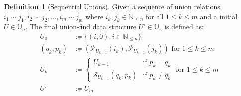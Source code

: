 \documentclass[a4paper,12pt]{article}
\theoremstyle{definition}
\newtheorem{definition}{Definition}[section]
\begin{document}
\begin{definition}[Sequential Unions]\label{def:sequential-unions}
    Given a sequence of union relations $i_1 \sim j_1, i_2 \sim j_2, \ldots, i_m
    \sim j_m$ where $i_k, j_k \in \mathbb{N}_{\leq n}$ for all $1 \leq k \leq m$
    and a initial  $U \in \mathbb{U}_n$. The final union-find data structure $U'
    \in \mathbb{U}_n$ is
    defined as:
    \begin{align*}
        U_0 &:= \{(i, 0) : i \in \mathbb{N}_{\leq n}\} \\
        (q_k, p_k) &:= (\mathcal{P}_{U_{k-1}}(i_k), \mathcal{P}_{U_{k-1}}(j_k)) \text{ for } 1 \leq k \leq m \\
        U_k &:= \begin{cases}
            U_{k-1} & \text{if } p_k = q_k \\
            \mathcal{S}_{U_{k-1}}(q_k, p_k) & \text{if } p_k \neq q_k
        \end{cases} \text{ for } 1 \leq k \leq m \\
        U' &:= U_m
    \end{align*}
\end{definition}
\end{document}
